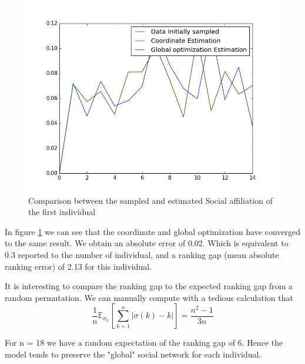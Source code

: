 \documentclass[12pt]{ociamthesis}  %
\begin{document}
	\begin{figure}
		\centering
		\includegraphics[width=\textwidth,height=\textheight,keepaspectratio]{LambdaEstimation}
		\caption{Comparison between the sampled and estimated Social affiliation of the first individual}
		\label{label-image1}
	\end{figure}
	
	In figure \ref{label-image1} we can see that the coordinate and global optimization have converged to the same result. We obtain an absolute error of 0.02. Which is equivalent to 0.3 reported to the number of individual, and a ranking gap (mean absolute ranking error) of 2.13 for this individual.
	
	It is interesting to compare the ranking gap to the expected ranking gap from a random permutation. We can manually compute with a tedious calculation that
	\begin{equation}
		\frac{1}{n} \mathbb{E}_{\mathbb{\sigma}_{n}}[ \sum_{k = 1}^{n} |\sigma(k) - k| ] = \frac{n^{2} - 1}{3n}
	\end{equation}
	
	For n = 18 we have a random expectation of the ranking gap of 6. Hence the model tends to preserve the "global" social network for each individual.
	
\end{document}

